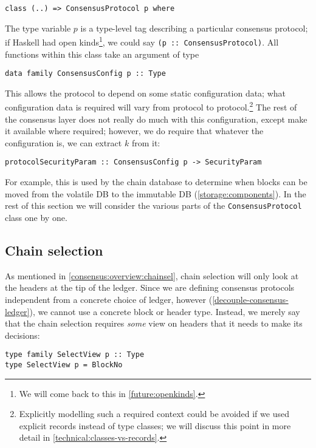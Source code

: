 \begin{lstlisting}
class (..) => ConsensusProtocol p where
\end{lstlisting}

The type variable $p$ is a type-level tag describing a particular consensus
protocol; if Haskell had open kinds\footnote{We will come back to this in
\cref{future:openkinds}.}, we could say \lstinline!(p :: ConsensusProtocol)!.
All functions within this class take an argument of type
%
\begin{lstlisting}
data family ConsensusConfig p :: Type
\end{lstlisting}
%
This allows the protocol to depend on some static configuration data; what
configuration data is required will vary from protocol to
protocol.\footnote{Explicitly modelling such a required context could be avoided
if we used explicit records instead of type classes; we will discuss this point
in more detail in \cref{technical:classes-vs-records}.}  The rest of the
consensus layer does not really do much with this configuration, except make it
available where required; however, we do require that whatever the configuration
is, we can extract $k$ from it:
%
\begin{lstlisting}
protocolSecurityParam :: ConsensusConfig p -> SecurityParam
\end{lstlisting}
%
For example, this is used by the chain database to determine when blocks can be
moved from the volatile DB to the immutable DB (\cref{storage:components}). In
the rest of this section we will consider the various parts of the
\lstinline!ConsensusProtocol! class one by one.

\subsection{Chain selection}
\label{consensus:class:chainsel}

As mentioned in \cref{consensus:overview:chainsel}, chain selection will only
look at the headers at the tip of the ledger. Since we are defining consensus
protocols independent from a concrete choice of ledger, however
(\cref{decouple-consensus-ledger}), we cannot use a concrete block or header
type. Instead, we merely say that the chain selection requires \emph{some} view
on headers that it needs to make its decisions:

\begin{lstlisting}
type family SelectView p :: Type
type SelectView p = BlockNo
\end{lstlisting}

